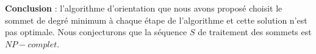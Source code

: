 {\bf Conclusion} : 
l'algorithme d'orientation que nous avons propos\'e choisit le sommet de degr\'e minimum \`a chaque \'etape de l'algorithme et cette solution n'est pas optimale.
Nous conjecturons que la s\'equence $S$ de traitement des sommets est $NP-complet$.


%
%
%
%
% 
